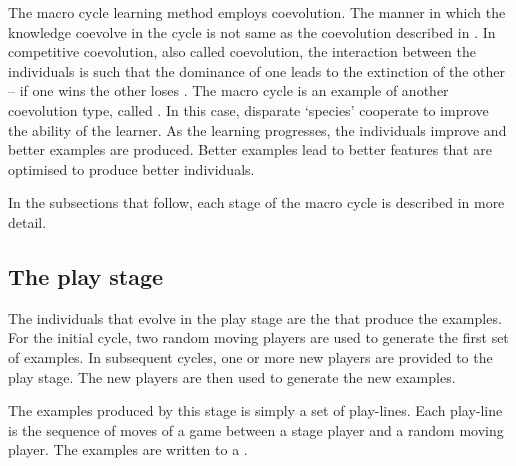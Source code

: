 The macro cycle learning method employs coevolution.  The manner in which the knowledge coevolve in the cycle is not same as the coevolution described in .  In competitive coevolution, also called  coevolution, the interaction between the individuals is such that the dominance of one leads to the extinction of the other -- if one wins the other loses   \cite{engelbrecht:coevolution}.  The macro cycle is an example of another coevolution type, called .  In this case, disparate `species' cooperate to improve the ability of the learner.  As the learning progresses, the individuals improve and better examples are produced. Better examples lead to better features that are optimised to produce better individuals.   

In the subsections that follow, each stage of the macro cycle is described in more detail.  

\subsection*{The play stage}
The individuals that evolve in the play stage are the  that produce the examples.  For the initial cycle, two random moving players are used to generate the first set of examples.  In subsequent cycles, one or more new players are provided to the play stage.  The new players are then used to generate the new examples.

The examples produced by this stage is simply a set of play-lines. Each play-line is the sequence of moves of a game between a stage player and a random moving player.  The examples are written to a .  
%
%

